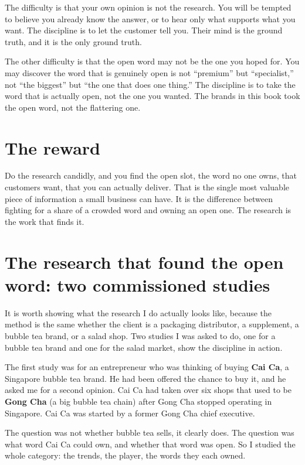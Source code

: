 \documentclass[10pt,twoside,openany]{memoir}
\newcommand{\needspacehead}{\needspace{4\baselineskip}}
\let\oldsection\section
\renewcommand{\section}{\needspacehead\oldsection}
\begin{document}
{The difficulty is that your own opinion is not the research. You will be
tempted to believe you already know the answer, or to hear only what
supports what you want. The discipline is to let the customer tell you.
Their mind is the ground truth, and it is the only ground truth.

The other difficulty is that the open word may not be the one you hoped
for. You may discover the word that is genuinely open is not ``premium''
but ``specialist,'' not ``the biggest'' but ``the one that does one
thing.'' The discipline is to take the word that is actually open, not
the one you wanted. The brands in this book took the open word, not the
flattering one.

\section{The reward}\label{the-reward}

Do the research candidly, and you find the open slot, the word no one
owns, that customers want, that you can actually deliver. That is the
single most valuable piece of information a small business can have. It
is the difference between fighting for a share of a crowded word and
owning an open one. The research is the work that finds it.

\section{The research that found the open word: two commissioned
studies}\label{the-research-that-found-the-open-word-two-commissioned-studies}

It is worth showing what the research I do actually looks like, because
the method is the same whether the client is a packaging distributor, a
supplement, a bubble tea brand, or a salad shop. Two studies I was asked
to do, one for a bubble tea brand and one for the salad market, show the
discipline in action.

The first study was for an entrepreneur who was thinking of buying
\textbf{Cai Ca}, a Singapore bubble tea brand. He had been offered the
chance to buy it, and he asked me for a second opinion. Cai Ca had taken
over six shops that used to be \textbf{Gong Cha} (a big bubble tea
chain) after Gong Cha stopped operating in Singapore. Cai Ca was started
by a former Gong Cha chief executive.

The question was not whether bubble tea sells, it clearly does. The
question was what word Cai Ca could own, and whether that word was open.
So I studied the whole category: the trends, the player, the words they
each owned.

}
\end{document}

